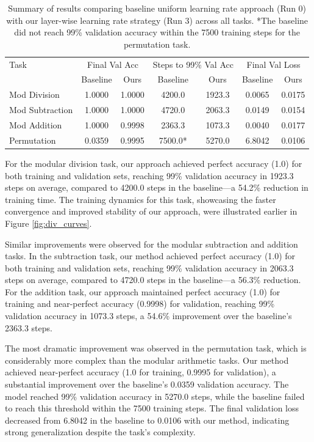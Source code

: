 \documentclass{article} %
\begin{document}
\begin{table}[h]
\centering
\begin{tabular}{lcccccc}
\toprule
Task & \multicolumn{2}{c}{Final Val Acc} & \multicolumn{2}{c}{Steps to 99\% Val Acc} & \multicolumn{2}{c}{Final Val Loss} \\
& Baseline & Ours & Baseline & Ours & Baseline & Ours \\
\midrule
Mod Division & 1.0000 & 1.0000 & 4200.0 & 1923.3 & 0.0065 & 0.0175 \\
Mod Subtraction & 1.0000 & 1.0000 & 4720.0 & 2063.3 & 0.0149 & 0.0154 \\
Mod Addition & 1.0000 & 0.9998 & 2363.3 & 1073.3 & 0.0040 & 0.0177 \\
Permutation & 0.0359 & 0.9995 & 7500.0* & 5270.0 & 6.8042 & 0.0106 \\
\bottomrule
\end{tabular}
\caption{Summary of results comparing baseline uniform learning rate approach (Run 0) with our layer-wise learning rate strategy (Run 3) across all tasks. *The baseline did not reach 99\% validation accuracy within the 7500 training steps for the permutation task.}
\label{tab:results_summary}
\end{table}

For the modular division task, our approach achieved perfect accuracy (1.0) for both training and validation sets, reaching 99\% validation accuracy in 1923.3 steps on average, compared to 4200.0 steps in the baseline---a 54.2\% reduction in training time. The training dynamics for this task, showcasing the faster convergence and improved stability of our approach, were illustrated earlier in Figure \ref{fig:div_curves}.


Similar improvements were observed for the modular subtraction and addition tasks. In the subtraction task, our method achieved perfect accuracy (1.0) for both training and validation sets, reaching 99\% validation accuracy in 2063.3 steps on average, compared to 4720.0 steps in the baseline---a 56.3\% reduction. For the addition task, our approach maintained perfect accuracy (1.0) for training and near-perfect accuracy (0.9998) for validation, reaching 99\% validation accuracy in 1073.3 steps, a 54.6\% improvement over the baseline's 2363.3 steps.

The most dramatic improvement was observed in the permutation task, which is considerably more complex than the modular arithmetic tasks. Our method achieved near-perfect accuracy (1.0 for training, 0.9995 for validation), a substantial improvement over the baseline's 0.0359 validation accuracy. The model reached 99\% validation accuracy in 5270.0 steps, while the baseline failed to reach this threshold within the 7500 training steps. The final validation loss decreased from 6.8042 in the baseline to 0.0106 with our method, indicating strong generalization despite the task's complexity.
\end{document}
